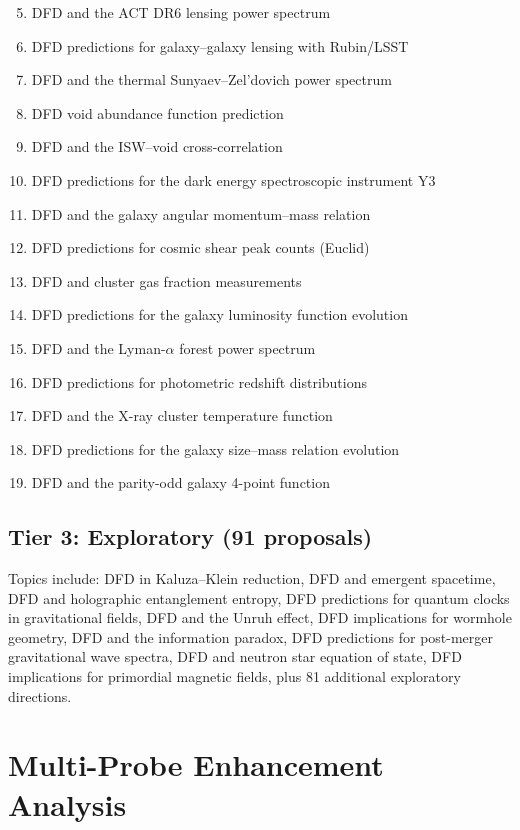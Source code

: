 \documentclass[11pt,a4paper]{article}
\begin{document}
\begin{enumerate}[nosep]
\setcounter{enumi}{4}
\item DFD and the ACT DR6 lensing power spectrum
\item DFD predictions for galaxy--galaxy lensing with Rubin/LSST
\item DFD and the thermal Sunyaev--Zel'dovich power spectrum
\item DFD void abundance function prediction
\item DFD and the ISW--void cross-correlation
\item DFD predictions for the dark energy spectroscopic instrument Y3
\item DFD and the galaxy angular momentum--mass relation
\item DFD predictions for cosmic shear peak counts (Euclid)
\item DFD and cluster gas fraction measurements
\item DFD predictions for the galaxy luminosity function evolution
\item DFD and the Lyman-$\alpha$ forest power spectrum
\item DFD predictions for photometric redshift distributions
\item DFD and the X-ray cluster temperature function
\item DFD predictions for the galaxy size--mass relation evolution
\item DFD and the parity-odd galaxy 4-point function
\end{enumerate}

\subsection{Tier 3: Exploratory (91 proposals)}

Topics include: DFD in Kaluza--Klein reduction, DFD and emergent spacetime, DFD and holographic entanglement entropy, DFD predictions for quantum clocks in gravitational fields, DFD and the Unruh effect, DFD implications for wormhole geometry, DFD and the information paradox, DFD predictions for post-merger gravitational wave spectra, DFD and neutron star equation of state, DFD implications for primordial magnetic fields, plus 81 additional exploratory directions.

\section{Multi-Probe Enhancement Analysis}
\end{document}
